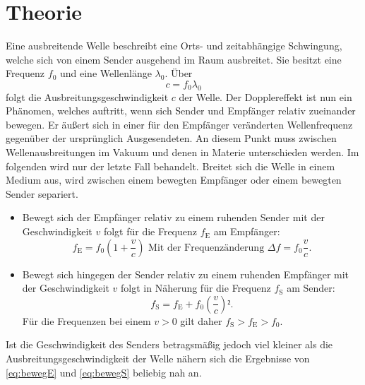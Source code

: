 
\section{Theorie}
\label{sec:Theorie}
Eine ausbreitende Welle beschreibt eine Orts- und zeitabhängige Schwingung,
 welche sich von einem Sender ausgehend im Raum ausbreitet. Sie besitzt eine Frequenz $f_0$ und eine Wellenlänge $\lambda_0$. Über
 \begin{equation}
   c = f_0 \lambda_0 \label{eq:c}
   \end{equation}
   folgt die Ausbreitungsgeschwindigkeit $c$ der Welle.
Der Dopplereffekt ist nun ein Phänomen, welches auftritt,
 wenn sich Sender und Empfänger relativ zueinander bewegen. Er äußert sich in
  einer für den Empfänger veränderten Wellenfrequenz gegenüber der ursprünglich
   Ausgesendeten. An diesem Punkt muss zwischen Wellenausbreitungen im Vakuum
    und denen in Materie unterschieden werden. Im folgenden wird nur der letzte
     Fall behandelt. Breitet sich die Welle in einem
     Medium aus, wird zwischen einem bewegten Empfänger oder einem bewegten
      Sender separiert.
\begin{itemize}
\item Bewegt sich der Empfänger relativ zu einem ruhenden Sender mit der
 Geschwindigkeit $v$ folgt für die Frequenz $f_\text{E}$ am Empfänger:
 \begin{equation}
   f_\text{E} = f_0\left(1+\frac{v}{c}\right) \text{ Mit der Frequenzänderung }\Delta f = f_0\frac{v}{c}\text{.}\label{eq:bewegE}
   \end{equation}
   \item Bewegt sich hingegen der Sender relativ zu einem ruhenden Empfänger mit der
    Geschwindigkeit $v$ folgt in Näherung für die Frequenz $f_\text{S}$ am Sender:
    \begin{equation}
      f_\text{S} = f_\text{E} + f_0\left(\frac{v}{c}\right)²\text{.}\label{eq:bewegS}
      \end{equation}
      Für die Frequenzen bei einem $v > 0$ gilt daher $f_\text{S} > f_\text{E} > f_0$.
\end{itemize}
Ist die Geschwindigkeit des Senders betragsmäßig jedoch viel kleiner als
 die Ausbreitungsgeschwindigkeit der Welle nähern sich die Ergebnisse von
  \eqref{eq:bewegE} und \eqref{eq:bewegS} beliebig nah an.
